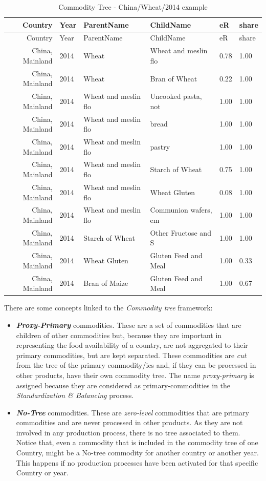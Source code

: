 \documentclass[]{article}
\providecommand{\tightlist}{%
  \setlength{\itemsep}{0pt}\setlength{\parskip}{0pt}}
\begin{document}
\begin{longtable}[]{@{}rlllll@{}}
\caption{Commodity Tree - China/Wheat/2014 example}\tabularnewline
\toprule
Country & Year & ParentName & ChildName & eR & share\tabularnewline
\midrule
\endfirsthead
\toprule
Country & Year & ParentName & ChildName & eR & share\tabularnewline
\midrule
\endhead
China, Mainland & 2014 & Wheat & Wheat and meslin flo & 0.78 &
1.00\tabularnewline
China, Mainland & 2014 & Wheat & Bran of Wheat & 0.22 &
1.00\tabularnewline
China, Mainland & 2014 & Wheat and meslin flo & Uncooked pasta, not &
1.00 & 1.00\tabularnewline
China, Mainland & 2014 & Wheat and meslin flo & bread & 1.00 &
1.00\tabularnewline
China, Mainland & 2014 & Wheat and meslin flo & pastry & 1.00 &
1.00\tabularnewline
China, Mainland & 2014 & Wheat and meslin flo & Starch of Wheat & 0.75 &
1.00\tabularnewline
China, Mainland & 2014 & Wheat and meslin flo & Wheat Gluten & 0.08 &
1.00\tabularnewline
China, Mainland & 2014 & Wheat and meslin flo & Communion wafers, em &
1.00 & 1.00\tabularnewline
China, Mainland & 2014 & Starch of Wheat & Other Fructose and S & 1.00 &
1.00\tabularnewline
China, Mainland & 2014 & Wheat Gluten & Gluten Feed and Meal & 1.00 &
0.33\tabularnewline
China, Mainland & 2014 & Bran of Maize & Gluten Feed and Meal & 1.00 &
0.67\tabularnewline
\bottomrule
\end{longtable}

There are some concepts linked to the \emph{Commodity tree} framework:

\begin{itemize}
\tightlist
\item
  \textbf{\emph{Proxy-Primary}} commodities. These are a set of
  commodities that are children of other commodities but, because they
  are important in representing the food availability of a country, are
  not aggregated to their primary commodities, but are kept separated.
  These commodities are \emph{cut} from the tree of the primary
  commodity/ies and, if they can be processed in other products, have
  their own commodity tree. The name \emph{proxy-primary} is assigned
  because they are considered as primary-commodities in the
  \emph{Standardization \& Balancing} process.
\item
  \textbf{\emph{No-Tree}} commodities. These are \emph{zero-level}
  commodities that are primary commodities and are never processed in
  other products. As they are not involved in any production process,
  there is no tree associated to them. Notice that, even a commodity
  that is included in the commodity tree of one Country, might be a
  No-tree commodity for another country or another year. This happens if
  no production processes have been activated for that specific Country
  or year.
\end{itemize}
\end{document}
